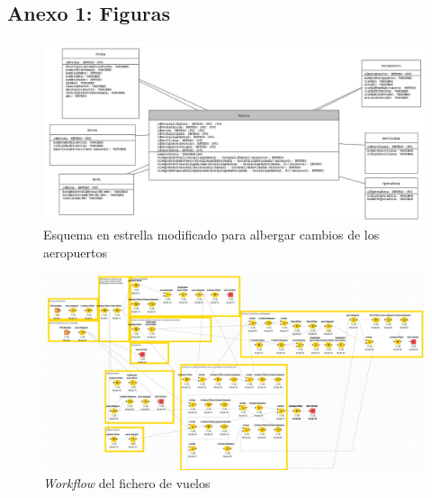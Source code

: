 \documentclass{article}
\begin{document}
\newpage
\begin{landscape}
\section{Anexo 1: Figuras}
    \begin{figure}[h!]
        \centering
        \includegraphics[scale=0.5]{images/esquema_estrella_modificado.jpg}
        \caption{Esquema en estrella modificado para albergar cambios de los aeropuertos}
        \label{fig:esquema_estrella_modificado}
    \end{figure}
    \newpage
    \begin{figure}
        \centering
        \includegraphics[scale=0.4]{images/workflow_vuelos.jpeg}
        \caption{\textit{Workflow} del fichero de vuelos}
        \label{fig:workflow_vuelos}
    \end{figure}
    \newpage
    \begin{figure}
        \centering

\end{figure}
\end{landscape}
\end{document}

